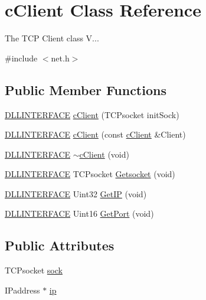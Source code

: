 \hypertarget{classc_client}{\section{c\-Client Class Reference}
\label{classc_client}
}


The T\-C\-P Client class V...  




{\ttfamily \#include $<$net.\-h$>$}

\subsection*{Public Member Functions}
\begin{DoxyCompactItemize}
\item 
\hyperlink{_s_d_l__ep_8h_a38dd54df4631b4daf553096353d7b20b}{D\-L\-L\-I\-N\-T\-E\-R\-F\-A\-C\-E} \hyperlink{classc_client_a686c3075ab0ba1f35c4614f1aea25ddf}{c\-Client} (T\-C\-Psocket init\-Sock)
\item 
\hyperlink{_s_d_l__ep_8h_a38dd54df4631b4daf553096353d7b20b}{D\-L\-L\-I\-N\-T\-E\-R\-F\-A\-C\-E} \hyperlink{classc_client_a384c10554dee5b1066f5ce369ea672b9}{c\-Client} (const \hyperlink{classc_client}{c\-Client} \&Client)
\item 
\hyperlink{_s_d_l__ep_8h_a38dd54df4631b4daf553096353d7b20b}{D\-L\-L\-I\-N\-T\-E\-R\-F\-A\-C\-E} \hyperlink{classc_client_ac77a8554ab9b0f1a45b35f8f906d695e}{$\sim$c\-Client} (void)
\item 
\hyperlink{_s_d_l__ep_8h_a38dd54df4631b4daf553096353d7b20b}{D\-L\-L\-I\-N\-T\-E\-R\-F\-A\-C\-E} T\-C\-Psocket \hyperlink{classc_client_a7a5ce316cb465052ee9447abcc228343}{Getsocket} (void)
\item 
\hyperlink{_s_d_l__ep_8h_a38dd54df4631b4daf553096353d7b20b}{D\-L\-L\-I\-N\-T\-E\-R\-F\-A\-C\-E} Uint32 \hyperlink{classc_client_ab1faf1408174b2c4c44025870e476e79}{Get\-I\-P} (void)
\item 
\hyperlink{_s_d_l__ep_8h_a38dd54df4631b4daf553096353d7b20b}{D\-L\-L\-I\-N\-T\-E\-R\-F\-A\-C\-E} Uint16 \hyperlink{classc_client_a3ae779e398115a6f845918902b3a92e8}{Get\-Port} (void)
\end{DoxyCompactItemize}
\subsection*{Public Attributes}
\begin{DoxyCompactItemize}
\item 
T\-C\-Psocket \hyperlink{classc_client_ada06233a81c09623a3ebb76897b1d3a9}{sock}
\item 
I\-Paddress $\ast$ \hyperlink{classc_client_ad1240b8a24e3339b48f07bd4de556336}{ip}
\end{DoxyCompactItemize}



